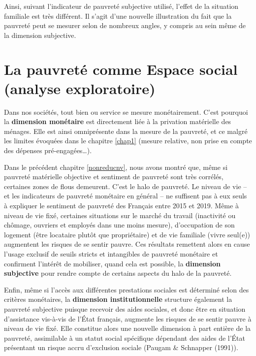 \documentclass[12pt,a4paper]{reedthesis}
\begin{document}
Ainsi, suivant l'indicateur de pauvreté subjective utilisé, l'effet de la situation familiale est très différent. Il s'agit d'une nouvelle illustration du fait que la pauvreté peut se mesurer selon de nombreux angles, y compris au sein même de la dimension subjective.

\hypertarget{esexplo}{%
\chapter{La pauvreté comme Espace social (analyse exploratoire)}\label{esexplo}}

Dans nos sociétés, tout bien ou service se mesure monétairement. C'est pourquoi la \textbf{dimension monétaire} est directement liée à la privation matérielle des ménages. Elle est ainsi omniprésente dans la mesure de la pauvreté, et ce malgré les limites évoquées dans le chapitre \ref{chap1} (mesure relative, non prise en compte des dépenses pré-engagées\ldots).

Dans le précédent chapitre \ref{nonreducnv}, nous avons montré que, même si pauvreté matérielle objective et sentiment de pauvreté sont très corrélés, certaines zones de flous demeurent. C'est le halo de pauvreté. Le niveau de vie -- et les indicateurs de pauvreté monétaire en général -- ne suffisent pas à eux seuls à expliquer le sentiment de pauvreté des Français entre 2015 et 2019. Même à niveau de vie fixé, certaines situations sur le marché du travail (inactivité ou chômage, ouvriers et employés dans une moins mesure), d'occupation de son logement (être locataire plutôt que propriétaire) et de vie familiale (vivre seul(e)) augmentent les risques de se sentir pauvre. Ces résultats remettent alors en cause l'usage exclusif de seuils stricts et intangibles de pauvreté monétaire et confirment l'intérêt de mobiliser, quand cela est possible, la \textbf{dimension subjective} pour rendre compte de certains aspects du halo de la pauvreté.

Enfin, même si l'accès aux différentes prestations sociales est déterminé selon des critères monétaires, la \textbf{dimension institutionnelle} structure également la pauvreté subjective puisque recevoir des aides sociales, et donc être en situation d'assistance vis-à-vis de l'État français, augmente les risques de se sentir pauvre à niveau de vie fixé. Elle constitue alors une nouvelle dimension à part entière de la pauvreté, assimilable à un statut social spécifique dépendant des aides de l'État présentant un risque accru d'exclusion sociale (Paugam \& Schnapper (1991)).
\end{document}
